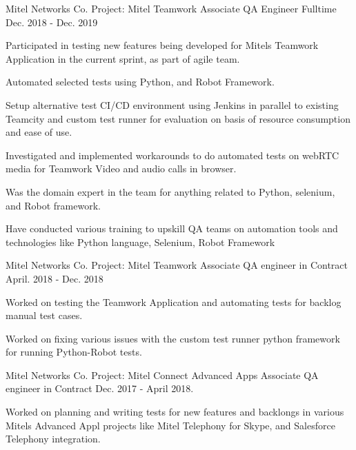 \begin{cventries}
	\cventry
		{ Mitel Networks Co. } %
		{ Project: Mitel Teamwork } %
		{ Associate QA Engineer Fulltime } %
		{ Dec. 2018 - Dec. 2019 } %
		{
			\begin{cvitems} %
				\item { Participated in testing new features being developed for Mitels Teamwork Application in the current sprint, as part of agile team. }
				\item { Automated selected tests using Python, and Robot Framework. }
				\item { Setup alternative test CI/CD environment using Jenkins in parallel to existing Teamcity and custom test runner for evaluation on basis of resource consumption and ease of use. }
				\item { Investigated and implemented workarounds to do automated tests on webRTC media for Teamwork Video and audio calls in browser.
				}
				\item { Was the domain expert in the team for anything related to Python, selenium, and Robot framework. } 
				\item { Have conducted various training to upskill QA teams on automation tools and technologies like Python language, Selenium, Robot Framework }
			\end{cvitems}
		}

	\cventry
		{ Mitel Networks Co. } %
		{ Project: Mitel Teamwork } %
		{ Associate QA engineer in Contract } %
		{ April. 2018 - Dec. 2018 } %
		{
			\begin{cvitems} %
				\item { Worked on testing the Teamwork Application and automating tests for backlog manual test cases. }
				\item { Worked on fixing various issues with the custom test runner python framework for running Python-Robot tests. 
				}
			\end{cvitems}
		}
	\cventry
		{ Mitel Networks Co. } %
		{ Project: Mitel Connect Advanced Apps } %
		{ Associate QA engineer in Contract } %
		{ Dec. 2017 - April 2018. } %
		{
			\begin{cvitems} %
				\item { Worked on planning and writing tests for new features and backlongs in various Mitels Advanced Appl projects like Mitel Telephony for Skype, and Salesforce Telephony integration. }
			\end{cvitems}
		}


\end{cventries}
